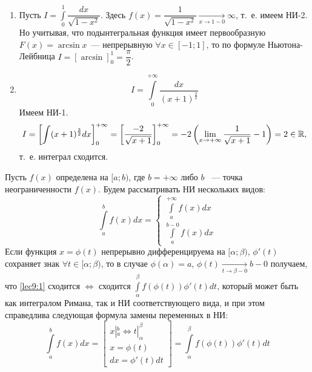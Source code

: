 \documentclass[../../main.tex]{subfiles}
\begin{document}
\begin{exmps}
\begin{enumerate}
	\item Пусть $I = \displaystyle\int\limits_{0}^1 \dfrac{dx}{\sqrt{1 - x^2}} $.
	Здесь $ f(x) = \dfrac{1}{\sqrt{1 - x^2}} \underset{x \to 1 - 0}{\to}
	\infty $, т.~е. имеем НИ-2. Но учитывая, что подынтегральная функция 
	имеет первообразную $ F(x) = \arcsin{x}$~--- непрерывную $ \forall x
	\in [-1; 1] $, то по формуле Ньютона-Лейбница $ 
	I = \left[\arcsin \right]_0^1 = \dfrac{\pi}{2} $.
	\item \[I = \int\limits_{0}^{+\infty} \dfrac{dx}{(x + 1)^{\frac{3}{2}}}\]
	Имеем НИ-1. \[I = \left[ \int (x + 1)^{\frac{3}{2}} dx\right]_0^{+\infty} 
	= \left[ \dfrac{-2}{\sqrt{x + 1}} \right]_0^{+\infty} = -2 \left(
	\lim\limits_{x \to + \infty} \dfrac{1}{\sqrt{x + 1}} - 1 \right) = 2
	\in \mathbb{R},\] т.~е. интеграл сходится.
\end{enumerate}
\end{exmps}
\begin{thm}
	Пусть $ f(x) $ определена на $ [a; b) $, где $ b = +\infty $ либо $ b $ ~---
	точка неограниченности $ f(x) $.
	Будем рассматривать НИ нескольких видов:
	\begin{equation}
		\label{lec9:1}
		\int\limits_a^b f(x) dx = 
		\begin{cases}
			\int\limits_a^{+\infty} f(x) dx\\
			\int\limits_{a}^{b - 0} f(x) dx
		\end{cases}
	\end{equation}
	Если функция $ x = \phi(t) $ непрерывно дифференцируема на $ [\alpha; \beta) 
	$,
	$ \phi'(t) $ сохраняет знак $ \forall t \in [\alpha; \beta) $, то
	в случае $ \phi(\alpha) = a $, $ \phi(t) \underset{t \to \beta - 0}{\to} b - 
	0
	$ получаем, что \eqref{lec9:1} сходится $\iff$ сходится
	$ \int\limits_\alpha^\beta f(\phi(t)) \phi'(t) dt $, который может быть как
	интегралом Римана, так и НИ соответствующего вида, и при этом справедлива 
	следующая формула замены переменных в НИ:
	\begin{equation}
		\label{lec9:2}
		\int\limits_a^b f(x) dx = 
		\begin{bmatrix}
			x|_a^b \iff t|_\alpha^\beta\\
			x = \phi(t)\\
			dx = \phi'(t)dt
		\end{bmatrix} =
		\int\limits_\alpha^\beta f(\phi(t)) \phi'(t) dt
	\end{equation}
\end{thm}
\end{document}

